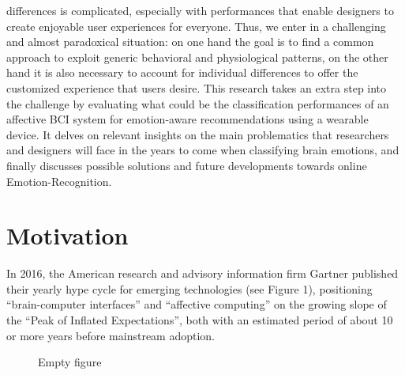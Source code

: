 differences is complicated, especially with performances that enable designers to create enjoyable user experiences for everyone. Thus, we enter in a challenging and almost paradoxical situation: on one hand the goal is to find a common approach to exploit generic behavioral and physiological patterns, on the other hand it is also necessary to account for individual differences to offer the customized experience that users desire. This research takes an extra step into the challenge by evaluating what could be the classification performances of an affective BCI system for emotion-aware recommendations using a wearable device. It delves on relevant insights on the main problematics that researchers and designers will face in the years to come when classifying brain emotions, and finally discusses possible solutions and future developments towards online Emotion-Recognition.

\section{Motivation}
\label{sec:motivation}
In 2016, the American research and advisory information firm Gartner published their yearly hype cycle for emerging technologies (see Figure 1), positioning “brain-computer interfaces” and “affective computing” on the growing slope of the “Peak of Inflated Expectations”, both with an estimated period of about 10 or more years before mainstream adoption.

\begin{figure}
\caption{Empty figure}\label{fig_hype_cycle}
\end{figure}

